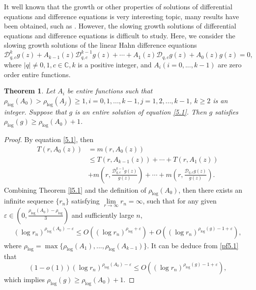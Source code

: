 \documentclass[sn-mathphys-num]{sn-jnl}%
\theoremstyle{thmstyleone}%
\newtheorem{theorem}{Theorem}%
\theoremstyle{thmstyletwo}%
\theoremstyle{thmstylethree}%
\begin{document}
\indent It well known that the growth or other properties of solutions of differential equations and difference equations is very interesting topic, many results have been obtained, such as \cite{CF1, GGG, Hei, Hel, li, l2016, l2018, l2024, l2025, wj2008, wpc2011}. However, the slowing growth solutions of differential equations and difference equations is difficult to study. Here, we consider the slowing growth solutions of the linear Hahn difference equations
\begin{equation}\label{5.1}
	\mathcal{D}_{q,c}^{k}g(z)+A_{k-1}(z)\mathcal{D}_{q,c}^{k-1}g(z)+\cdots+A_{1}(z)\mathcal{D}_{q,c}g(z)+A_{0}(z)g(z)=0,
\end{equation}
where \(|q|\neq0,1, c\in\mathbb{C}, k\) is a positive integer, and \(A_{i}(i=0,...,k-1)\) are zero order entire functions.
\begin{theorem}
	Let \(A_{i}\) be entire functions such that \(\rho_{\log}(A_{0})>\rho_{\log}(A_{j})\geq1,i=0,1,...,k-1,j=1,2,...,k-1\), \(k\geq2\) is an integer. Suppose that \(g\) is an entire solution of equation \eqref{5.1}. Then \(g\) satisfies \(\rho_{\log}(g)\geq\rho_{\log}(A_{0})+1\).
\end{theorem}
\begin{proof}
	\indent By equation \eqref{5.1}, then
	\begin{align}
		T(r,A_{0}(z))&=m(r,A_{0}(z))\nonumber\\
		&\leq T(r,A_{k-1}(z))+\cdots+T(r,A_{1}(z))\\
		&+m\left(r,\frac{\mathcal{D}_{q,c}^{k-1}g(z)}{g(z)}\right)+\cdots+m\left(r,\frac{\mathcal{D}_{q,c}g(z)}{g(z)}\right)\nonumber.
	\end{align}
	\indent Combining Theorem \ref{l5.1} and the definition of \(\rho_{\log}(A_{0})\), then there exists an infinite sequence \(\{r_{n}\}\) satisfying \(\lim\limits_{r\to\infty}r_{n}=\infty\), such that for any given \(\varepsilon\in(0,\frac{\rho_{\log}(A_{0})-\rho_{\log}}{3})\) and sufficiently large \(n\),
	\begin{align}\label{pf5.1}
		(\log r_{n})^{\rho_{\log}(A_{0})-\varepsilon}\leq O((\log r_{n})^{\rho_{\log}+\varepsilon})+O((\log r_{n})^{\rho_{\log}(g)-1+\varepsilon}),
	\end{align}
	where \(\rho_{\log}=\max\{\rho_{\log}(A_{1}),...,\rho_{\log}(A_{k-1})\}\). It can be deduce from \eqref{pf5.1} that
	$$(1-o(1))(\log r_{n})^{\rho_{\log}(A_{0})-\varepsilon}\leq O((\log r_{n})^{\rho_{\log}(g)-1+\varepsilon}),$$
	which implies \(\rho_{\log}(g)\geq\rho_{\log}(A_{0})+1\).
\end{proof}
\end{document}
